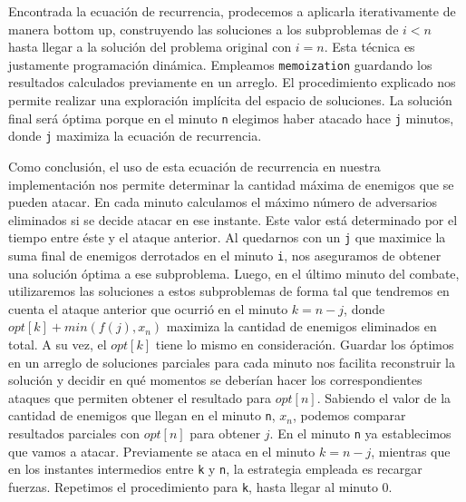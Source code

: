\documentclass{article}
\begin{document}
Encontrada la ecuación de recurrencia, prodecemos a aplicarla iterativamente de manera bottom up, construyendo las soluciones a los subproblemas de $i < n$ hasta llegar a la solución del problema original con $i = n$. Esta técnica es justamente programación dinámica. Empleamos \texttt{memoization} guardando los resultados calculados previamente en un arreglo. El procedimiento explicado nos permite realizar una exploración implícita del espacio de soluciones. La solución final será óptima porque en el minuto \texttt{n} elegimos haber atacado hace \texttt{j} minutos, donde \texttt{j} maximiza la ecuación de recurrencia.

Como conclusión, el uso de esta ecuación de recurrencia en nuestra implementación nos permite determinar la cantidad máxima de enemigos que se pueden atacar. En cada minuto calculamos el  máximo número de adversarios eliminados si se decide atacar en ese instante. Este valor está determinado por el tiempo entre éste y el ataque anterior. Al quedarnos con un \texttt{j} que maximice la suma final de enemigos derrotados en el minuto \texttt{i}, nos aseguramos de obtener una solución óptima a ese subproblema. Luego, en el último minuto del combate, utilizaremos las soluciones a estos subproblemas de forma tal que tendremos en cuenta el ataque anterior que ocurrió en el minuto $k = n - j$, donde $opt[k] + min(f(j), x_n)$ maximiza la cantidad de enemigos eliminados en total. A su vez, el $opt[k]$ tiene lo mismo en consideración. Guardar los óptimos en un arreglo de soluciones parciales para cada minuto nos facilita reconstruir la solución y decidir en qué momentos se deberían hacer los correspondientes ataques que permiten obtener el resultado para $opt[n]$. Sabiendo el valor de la cantidad de enemigos que llegan en el minuto \texttt{n}, $x_n$, podemos comparar resultados parciales con $opt[n]$ para obtener $j$. En el minuto \texttt{n} ya establecimos que vamos a atacar. Previamente se ataca en el minuto $k = n - j$, mientras que en los instantes intermedios entre \texttt{k} y \texttt{n}, la estrategia empleada es recargar fuerzas. Repetimos el procedimiento para \texttt{k}, hasta llegar al minuto 0. 
\end{document}
